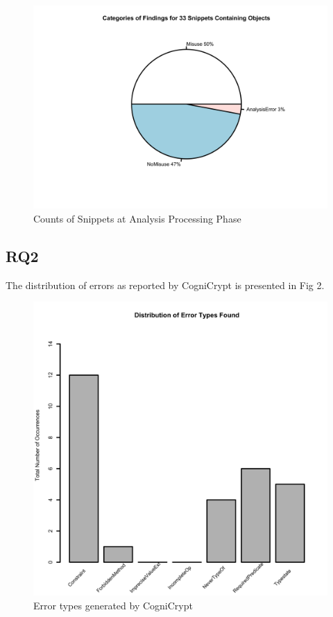 \documentclass[10pt, conference]{IEEEtran}
\begin{document}
\begin{figure}[h]
\begin{center}
\includegraphics[width=0.9\linewidth]{PieObjOnly.png}
\caption{Counts of Snippets at Analysis Processing Phase}
\end{center}
\end{figure}


\subsection{RQ2}

The distribution of errors as reported by CogniCrypt is presented in Fig 2.

\begin{figure}[h]
\begin{center}
\includegraphics[width=0.9\linewidth]{Dist.png}
\caption{Error types generated by CogniCrypt}
\end{center}
\end{figure}
\end{document}
